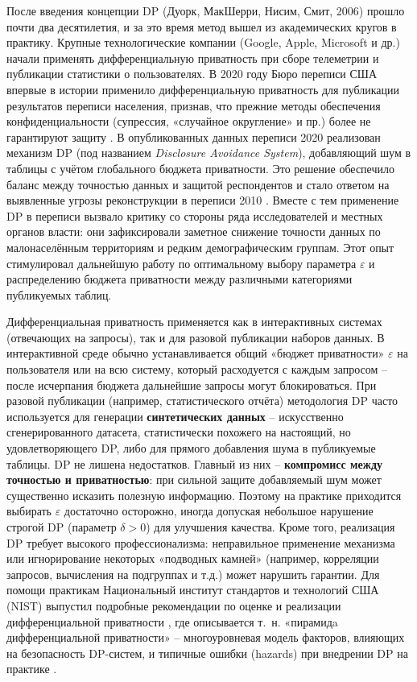После введения концепции DP (Дуорк, МакШерри, Нисим, Смит, 2006) \autocite{dwork2006} прошло почти два десятилетия, и за это
время метод вышел из академических кругов в практику. Крупные технологические компании (Google, Apple, Microsoft и др.)
начали применять дифференциальную приватность при сборе телеметрии и публикации статистики о пользователях. В 2020 году
Бюро переписи США впервые в истории применило дифференциальную приватность для публикации результатов переписи
населения, признав, что прежние методы обеспечения конфиденциальности (супрессия, «случайное округление» и пр.) более не
гарантируют защиту \autocite{cornell-edu}. В опубликованных данных переписи 2020 реализован механизм DP (под названием
\textit{Disclosure Avoidance System}), добавляющий шум в таблицы с учётом глобального бюджета приватности. Это решение
обеспечило баланс между точностью данных и защитой респондентов и стало ответом на
выявленные угрозы реконструкции в переписи 2010 \autocite{census-gov} \autocite{cornell-edu}.
Вместе с тем применение DP в переписи вызвало критику со стороны ряда исследователей и
местных органов власти: они зафиксировали заметное снижение точности данных по малонаселённым
территориям и редким демографическим группам. Этот опыт стимулировал дальнейшую работу по
оптимальному выбору параметра $\varepsilon$ и распределению бюджета приватности между
различными категориями публикуемых таблиц.

Дифференциальная приватность применяется как в интерактивных системах (отвечающих на запросы), так и для разовой публикации наборов
данных. В интерактивной среде обычно устанавливается общий «бюджет приватности» $\varepsilon$ на пользователя или на всю
систему, который расходуется с каждым запросом – после исчерпания бюджета дальнейшие запросы могут блокироваться. При
разовой публикации (например, статистического отчёта) методология DP часто используется для генерации
\textbf{синтетических данных} – искусственно сгенерированного датасета, статистически похожего на настоящий, но
удовлетворяющего DP, либо для прямого добавления шума в публикуемые таблицы. DP не лишена недостатков. Главный из них –
\textbf{компромисс между точностью и приватностью}: при сильной защите добавляемый шум может существенно исказить
полезную информацию. Поэтому на практике приходится выбирать $\varepsilon$ достаточно осторожно, иногда допуская
небольшое нарушение строгой DP (параметр $\delta>0$) для улучшения качества. Кроме того, реализация DP требует высокого
профессионализма: неправильное применение механизма или игнорирование некоторых «подводных камней» (например, корреляции
запросов, вычисления на подгруппах и т.д.) может нарушить гарантии. Для помощи практикам Национальный институт
стандартов и технологий США (NIST) выпустил подробные рекомендации по оценке и реализации дифференциальной приватности
\autocite{nvlpubs-nist-gov}, где описывается т. н. «пирамидa дифференциальной приватности» – многоуровневая модель
факторов, влияющих на безопасность DP-систем, и типичные ошибки (hazards) при внедрении DP на практике
\autocite{nvlpubs-nist-gov}.

